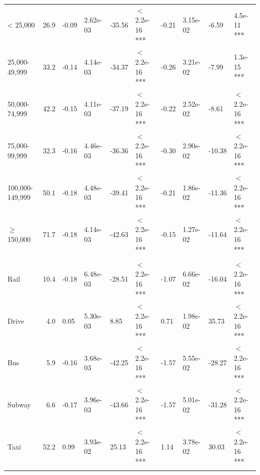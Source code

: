 \documentclass[numbered]{trbunofficial}\usepackage[]{graphicx}\usepackage[]{color}
\begin{document}
\begin{table}[H]
\begin{tabular}{lrllllllll}
\addlinespace[0.3em]
\multicolumn{10}{l}{\textbf{Income model, $McFadden~R^2 = 0.55$}}\\
\hline
\hspace{1em}< 25,000 & 26.9 & -0.09 & 2.62e-03 & -35.56 & $<$ 2.2e-16 *** & -0.21 & 3.15e-02 & -6.59 & 4.5e-11 ***\\
\hspace{1em}25,000-49,999 & 33.2 & -0.14 & 4.14e-03 & -34.37 & $<$ 2.2e-16 *** & -0.26 & 3.21e-02 & -7.99 & 1.3e-15 ***\\
\hspace{1em}50,000-74,999 & 42.2 & -0.15 & 4.11e-03 & -37.19 & $<$ 2.2e-16 *** & -0.22 & 2.52e-02 & -8.61 & $<$ 2.2e-16 ***\\
\hspace{1em}75,000-99,999 & 32.3 & -0.16 & 4.46e-03 & -36.36 & $<$ 2.2e-16 *** & -0.30 & 2.90e-02 & -10.38 & $<$ 2.2e-16 ***\\
\hspace{1em}100,000-149,999 & 50.1 & -0.18 & 4.48e-03 & -39.41 & $<$ 2.2e-16 *** & -0.21 & 1.86e-02 & -11.36 & $<$ 2.2e-16 ***\\
\hspace{1em}$\geq$ 150,000 & 71.7 & -0.18 & 4.14e-03 & -42.63 & $<$ 2.2e-16 *** & -0.15 & 1.27e-02 & -11.64 & $<$ 2.2e-16 ***\\
\addlinespace[0.3em]
\multicolumn{10}{l}{\textbf{Mode model, $McFadden~R^2 = 0.65$}}\\
\hline
\hspace{1em}Rail & 10.4 & -0.18 & 6.48e-03 & -28.51 & $<$ 2.2e-16 *** & -1.07 & 6.66e-02 & -16.04 & $<$ 2.2e-16 ***\\
\hspace{1em}Drive & 4.0 & 0.05 & 5.30e-03 & 8.85 & $<$ 2.2e-16 *** & 0.71 & 1.98e-02 & 35.73 & $<$ 2.2e-16 ***\\
\hspace{1em}Bus & 5.9 & -0.16 & 3.68e-03 & -42.25 & $<$ 2.2e-16 *** & -1.57 & 5.55e-02 & -28.27 & $<$ 2.2e-16 ***\\
\hspace{1em}Subway & 6.6 & -0.17 & 3.96e-03 & -43.66 & $<$ 2.2e-16 *** & -1.57 & 5.01e-02 & -31.28 & $<$ 2.2e-16 ***\\
\hspace{1em}Taxi & 52.2 & 0.99 & 3.93e-02 & 25.13 & $<$ 2.2e-16 *** & 1.14 & 3.78e-02 & 30.03 & $<$ 2.2e-16 ***\\
\addlinespace[0.3em]
\multicolumn{10}{l}{\textbf{Travel distance model, $McFadden~R^2 = 0.55$}}\\

\end{tabular}
\end{table}
\end{document}
